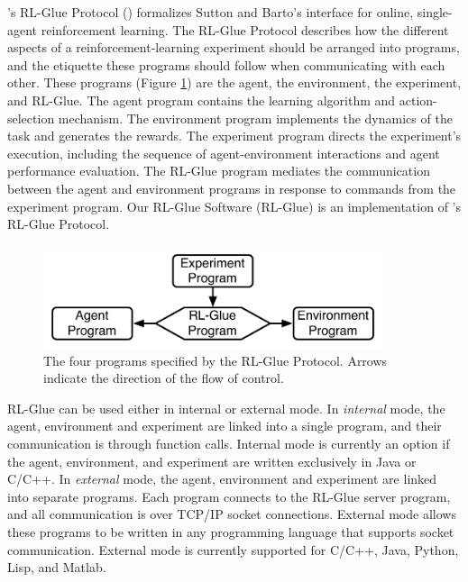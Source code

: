 \documentclass[twoside,11pt]{article}
\begin{document}
\citeauthor{whiteThesis}'s RL-Glue Protocol (\citeyear{whiteThesis}) formalizes Sutton and Barto's interface for online, single-agent reinforcement learning.  The RL-Glue Protocol describes how the different aspects of a reinforcement-learning experiment should be arranged into programs, and the etiquette these programs should follow when communicating with each other. These programs (Figure \ref{fig:RLDIA}) are the agent, the environment, the experiment, and RL-Glue.  The agent program contains the learning algorithm and action-selection mechanism. The environment program implements the dynamics of the task and generates the rewards. The experiment program directs the experiment's execution, including the sequence of agent-environment interactions and agent performance evaluation.  The RL-Glue program mediates the communication between the agent and environment programs in response to commands from the experiment program. Our RL-Glue Software (RL-Glue) is an implementation of \citeauthor{whiteThesis}'s RL-Glue Protocol. 

\vspace{-0.4cm}
\begin{figure}[ht]
\begin{center}
\includegraphics[height=3cm]{figures/glue.pdf}
\vspace{-0.4cm}
\caption{\small The four programs specified by the RL-Glue Protocol.  Arrows indicate the direction of the flow of control.}
\label{fig:RLDIA}
\end{center}
\vspace{-0.7cm}
\end{figure}

 RL-Glue can be used either in  internal or external mode.  In \textit{internal} mode, the agent, environment and experiment are linked into a single program, and their communication is through function calls.  Internal mode is currently an option if the agent, environment, and experiment are written exclusively in Java or C/C++.  In  \textit{external} mode, the agent, environment and experiment are linked into separate programs.  Each program connects to the RL-Glue server program, and all communication is over TCP/IP socket connections. External mode allows these programs to be written in any programming language that supports socket communication.  External mode is currently supported for C/C++, Java, Python, Lisp, and Matlab.
\end{document}

